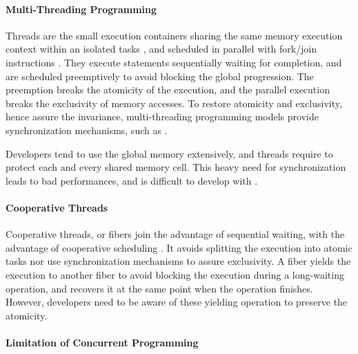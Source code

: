 

\paragraph{Multi-Threading Programming}

Threads are the small execution containers sharing the same memory execution context within an isolated tasks \cite{Dijkstra1968}, and scheduled in parallel with fork/join instructions \cite{Randall1998,Frigo1998,Leiserson2010}.
They execute statements sequentially waiting for completion, and are scheduled preemptively to avoid blocking the global progression.
The preemption breaks the atomicity of the execution, and the parallel execution breaks the exclusivity of memory accesses.
To restore atomicity and exclusivity, hence assure the invariance, multi-threading programming models provide synchronization mechanisms, such as .

Developers tend to use the global memory extensively, and threads require to protect each and every shared memory cell.
This heavy need for synchronization leads to bad performances, and is difficult to develop with \cite{Adya2002}.

\paragraph{Cooperative Threads}

Cooperative threads, or fibers join the advantage of sequential waiting, with the advantage of cooperative scheduling \cite{Adya2002,Behren2003a}.
It avoids splitting the execution into atomic tasks nor use synchronization mechanisms to assure exclusivity.
A fiber yields the execution to another fiber to avoid blocking the execution during a long-waiting operation, and recovers it at the same point when the operation finishes.
However, developers need to be aware of these yielding operation to preserve the atomicity.

\paragraph{Limitation of Concurrent Programming}



